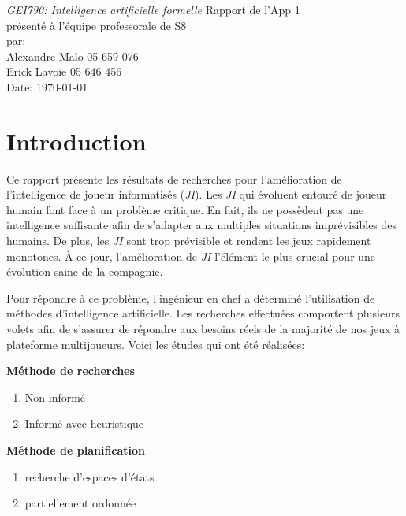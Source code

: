 \documentclass[12pt,english,frenchb,letterpaper]{article}
\begin{document}
\thispagestyle{empty}
\begin{center}
{\large\em GEI790:  Intelligence artificielle formelle}
\vfill
Rapport de l'App 1\\
présenté à l'équipe professorale de S8\\
\vfill
par:\\
Alexandre Malo\hspace{2cm} 05 659 076\\
Erick Lavoie\hspace{2cm} 05 646 456\\
\vfill
Date: \today
\end{center}

\newpage
\onehalfspacing


\tableofcontents

\newpage


\section{Introduction}
Ce rapport présente les résultats de recherches pour l'amélioration de l'intelligence de joueur informatisés (\textit{JI}).
Les \textit{JI} qui évoluent entouré de joueur humain font face à un problème critique. En fait, ils ne possèdent pas une intelligence suffisante afin de s'adapter aux multiples situations imprévisibles des humains. De plus, les \textit{JI} sont trop prévisible et rendent les jeux rapidement monotones. À ce jour, l'amélioration de \textit{JI} l'élément le plus crucial pour une évolution saine de la compagnie.

Pour répondre à ce problème, l'ingénieur en chef a déterminé l'utilisation de méthodes d'intelligence artificielle. Les recherches effectuées comportent plusieurs volets afin de s'assurer de répondre aux besoins réels de la majorité de nos jeux à plateforme multijoueurs. Voici les études qui ont été réalisées:

\textbf{Méthode de recherches}
\begin{enumerate}
 \item Non informé
 \item Informé avec heuristique
\end{enumerate}

\textbf{Méthode de planification}
\begin{enumerate}
 \item recherche d'espaces d'états
 \item partiellement ordonnée
\end{enumerate}
\end{document}

